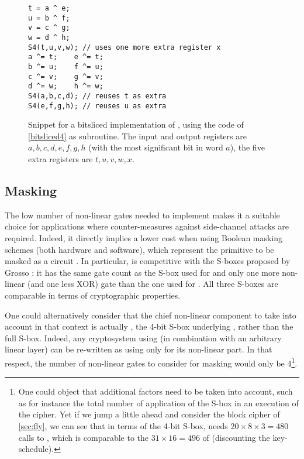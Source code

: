 \begin{figure}[ht]
\begin{verbatim}
t = a ^ e;
u = b ^ f;
v = c ^ g;
w = d ^ h;
S4(t,u,v,w); // uses one more extra register x
a ^= t;    e ^= t;
b ^= u;    f ^= u;
c ^= v;    g ^= v;
d ^= w;    h ^= w;
S4(a,b,c,d); // reuses t as extra
S4(e,f,g,h); // reuses u as extra
\end{verbatim}
\caption[Snippet for a bitsliced \C implementation of \littlunOne.]{Snippet for a bitsliced \C implementation of \littlunOne, using the code of \autoref{bitsliced4} as subroutine\label{bitsliced8}. The input and output registers
are $a,b,c,d,e,f,g,h$ (with the most significant bit in word $a$), the five extra registers are $t,u,v,w,x$.}
\end{figure}


\subsection{Masking}
The low number of non-linear gates needed to implement \littlunOne makes it a suitable choice for applications where counter-measures against side-channel attacks are required.
Indeed, it directly implies a lower cost when using Boolean masking schemes (both hardware and software), which represent the primitive to be masked as a circuit \cite{isw,DBLP:conf/fse/CarletGPQR12}.
In particular, \littlunOne is competitive with the S-boxes proposed by Grosso \etal \cite{lsdesigns}: it has the same gate count as the S-box used for \robin and only
one more non-linear (and one less XOR) gate than the one used for \fantomas. All three S-boxes are comparable in terms of cryptographic properties.

One could alternatively consider that the chief non-linear component to take into account in that context is actually \littlunS, the 4-bit S-box underlying \littlunOne, rather than the full S-box.
Indeed, any cryptosystem using \littlunOne (in combination with an arbitrary linear layer)
can be re-written as using only \littlunS for its non-linear part. In that respect, the number of non-linear gates to consider for masking would only be 4\footnote{One could object that
additional factors need to be taken into account, such as for instance the total number of application of the S-box in an execution of the cipher. Yet if we jump a little ahead and
consider the block cipher \fly of \autoref{sec:fly}, we can see that in terms of the 4-bit S-box, \fly needs $20\times8\times3 = 480$ calls to \littlunS, which is
comparable to the $31\times16 = 496$ of \present (discounting the key-schedule).}.

